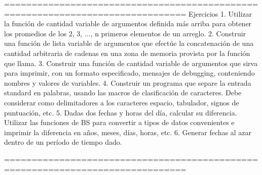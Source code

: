 ===============================================================================
Ejercicios
1. Utilizar la función de cantidad variable de argumentos definida más arriba
para obtener los promedios de los 2, 3, ..., n primeros elementos de un
arreglo.
2. Construir una función de lista variable de argumentos que efectúe la
concatenación de una cantidad arbitraria de cadenas en una zona de memoria
provista por la función que llama.
3. Construir una función de cantidad variable de argumentos que sirva para
imprimir, con un formato especificado, mensajes de debugging, conteniendo
nombres y valores de variables.
4. Construir un programa que separe la entrada standard en palabras, usando las
macros de clasificación de caracteres. Debe considerar como delimitadores a los
caracteres espacio, tabulador, signos de puntuación, etc.
5. Dadas dos fechas y horas del día, calcular su diferencia. Utilizar las
funciones de BS para convertir a tipos de datos convenientes e imprimir la
diferencia en años, meses, días, horas, etc.
6. Generar fechas al azar dentro de un período de tiempo dado.

===============================================================================





